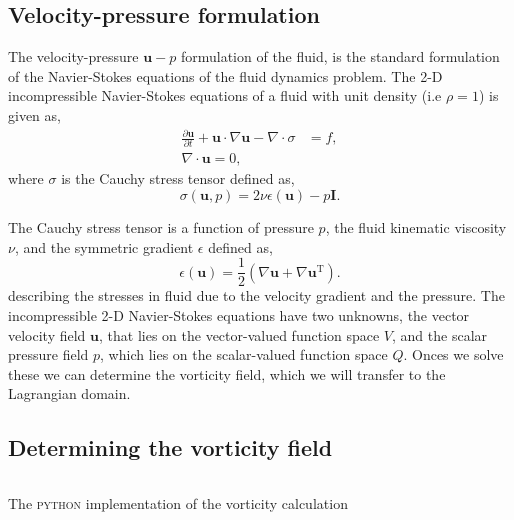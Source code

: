 \subsection{Velocity-pressure formulation}
The velocity-pressure $\mathbf{u}-p$ formulation of the fluid, is the standard formulation of the Navier-Stokes equations of the fluid dynamics problem. The 2-D incompressible Navier-Stokes equations of a fluid with unit density (i.e $\rho = 1$) is given as,
	\begin{subequations}
	\begin{align}
	\frac{\partial \mathbf{u}}{\partial t} + \mathbf{u}\cdot\nabla\mathbf{u} - \nabla \cdot \sigma &= f,\\
	\nabla \cdot \mathbf{u} = 0,
	\end{align}	
	\label{eq:2Dns}
	\end{subequations}
where $\sigma$ is the Cauchy stress tensor defined as,
	\begin{equation}
	\sigma(\mathbf{u},p) = 2\nu\epsilon(\mathbf{u}) - p\mathbf{I}.
	\end{equation}

The Cauchy stress tensor is a function of pressure $p$, the fluid kinematic viscosity $\nu$, and the symmetric gradient $\epsilon$ defined as,
	\begin{equation}
	\epsilon(\mathbf{u}) = \frac{1}{2} \left(\nabla \mathbf{u} + \nabla \mathbf{u}^{\mathrm{T}}\right).
	\label{eq:symGrad}
	\end{equation}
describing the stresses in fluid due to the velocity gradient and the pressure. The incompressible 2-D Navier-Stokes equations have two unknowns, the vector velocity field $\mathbf{u}$, that lies on the vector-valued function space $V$, and the scalar pressure field $p$, which lies on the scalar-valued function space $Q$. Onces we solve these we can determine the vorticity field, which we will transfer to the Lagrangian domain. 

\subsection{Determining the vorticity field}

	\begin{listing}[t]
	\inputminted[fontseries=courier,obeytabs,fontsize=\footnotesize,mathescape,linenos,numbersep=5pt,frame=lines,framesep=2mm,xleftmargin=20mm,xrightmargin=20mm]{python}{figures/eulerian/vorticity.py}
	\caption{The \textsc{python} implementation of the vorticity calculation}
	\label{lst:pycode-vorticity}
	\end{listing}

